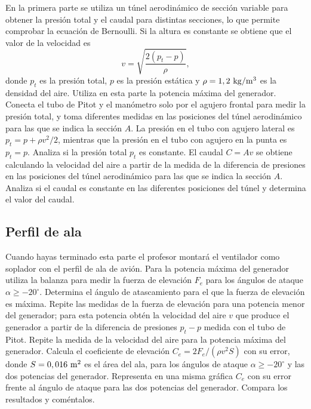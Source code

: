 \documentclass[11pt]{articulo}
\begin{document}
En la primera parte se utiliza un t\'unel aerodin\'amico de secci\'on variable para obtener la presi\'on total y el caudal para distintas secciones, lo que permite comprobar la ecuaci\'on de Bernoulli. Si la altura es constante se obtiene que el valor de la velocidad es
%
\begin{equation*}
v = \sqrt{\frac{2(p_t - p)}{\rho}},
\end{equation*}
%
donde $p_t$ es la presi\'on total,  $p$ es la presi\'on est\'atica y $\rho = 1,2~{\rm kg/m^3}$ es la densidad del aire. Utiliza en esta parte la potencia m\'axima del generador. Conecta el tubo de Pitot y el man\'ometro solo por el agujero frontal para medir la presi\'on total, y toma diferentes medidas en las posiciones del t\'unel aerodin\'amico para las que se indica la secci\'on $A$. La presi\'on en el tubo con agujero lateral es $p_t = p + \rho v^2 / 2$, mientras que la presi\'on en el tubo con agujero en la punta es $p_t = p$. Analiza si la presi\'on total $p_t$ es constante. El caudal $C = Av$ se obtiene calculando la velocidad del aire a partir de la medida de la diferencia de presiones en las posiciones del t\'unel aerodin\'amico para las que se indica la secci\'on $A$. Analiza si el caudal es constante en las diferentes posiciones del t\'unel y determina el valor del caudal.

\subsection{Perfil de ala}

Cuando hayas terminado esta parte el profesor montar\'a el ventilador como soplador con el perfil de ala de avi\'on. Para la potencia m\'axima del generador utiliza la balanza para medir la fuerza de elevaci\'on $F_e$ para los \'angulos de ataque $\alpha \ge -20^{\circ}$. Determina el \'angulo de atascamiento para el que la fuerza de elevaci\'on es m\'axima. Repite las medidas de la fuerza de elevaci\'on para una potencia menor del generador; para esta potencia obt\'en la velocidad del aire $v$ que produce el generador a partir de la diferencia de presiones $p_t - p$ medida con el tubo de Pitot. Repite la medida de la velocidad del aire para la potencia m\'axima del generador. Calcula el coeficiente de elevaci\'on $C_e = 2 F_e / (\rho v^2 S)$ con su error, donde $S = 0,016~{\rm m^2}$ es el \'area del ala, para los \'angulos de ataque $\alpha \geq -20^{\circ}$ y las dos potencias del generador. Representa en una misma gr\'afica $C_e$ con su error frente al \'angulo de ataque para las dos potencias del generador. Compara los resultados y com\'entalos.
\end{document}
